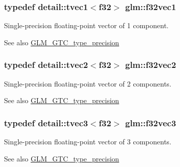 \subsubsection[{f32vec1}]{\setlength{\rightskip}{0pt plus 5cm}typedef detail\+::tvec1$<$f32$>$ {\bf glm\+::f32vec1}}\label{group__gtc__type__precision_ga7cc1cb4f45d7274383e6f4ee7fd46f33}
Single-\/precision floating-\/point vector of 1 component. \begin{DoxySeeAlso}{See also}
\hyperlink{group__gtc__type__precision}{G\+L\+M\+\_\+\+G\+T\+C\+\_\+type\+\_\+precision} 
\end{DoxySeeAlso}
\hypertarget{group__gtc__type__precision_ga6262c3e58cb4a96545b9ec56f141fa1a}{}
\subsubsection[{f32vec2}]{\setlength{\rightskip}{0pt plus 5cm}typedef detail\+::tvec2$<$f32$>$ {\bf glm\+::f32vec2}}\label{group__gtc__type__precision_ga6262c3e58cb4a96545b9ec56f141fa1a}
Single-\/precision floating-\/point vector of 2 components. \begin{DoxySeeAlso}{See also}
\hyperlink{group__gtc__type__precision}{G\+L\+M\+\_\+\+G\+T\+C\+\_\+type\+\_\+precision} 
\end{DoxySeeAlso}
\hypertarget{group__gtc__type__precision_ga6bb80987350b58f1869fd877bf70d316}{}
\subsubsection[{f32vec3}]{\setlength{\rightskip}{0pt plus 5cm}typedef detail\+::tvec3$<$f32$>$ {\bf glm\+::f32vec3}}\label{group__gtc__type__precision_ga6bb80987350b58f1869fd877bf70d316}
Single-\/precision floating-\/point vector of 3 components. \begin{DoxySeeAlso}{See also}
\hyperlink{group__gtc__type__precision}{G\+L\+M\+\_\+\+G\+T\+C\+\_\+type\+\_\+precision} 
\end{DoxySeeAlso}
\hypertarget{group__gtc__type__precision_ga87b80bb1fb0fba6433912ab9aec05f2c}{}
